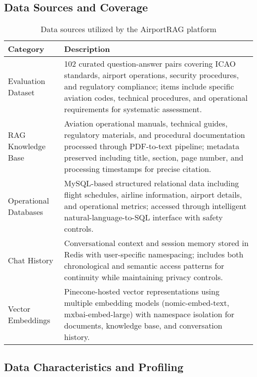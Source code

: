 \subsection{Data Sources and Coverage}
\label{subsec:data_sources_s2}
\begin{table}[H]
\centering
\caption{Data sources utilized by the AirportRAG platform}
\label{tab:data_sources_s2}
\begin{tabular}{|p{4cm}|p{12cm}|}
\hline
\textbf{Category} & \textbf{Description} \\
\hline
Evaluation Dataset &
102 curated question-answer pairs covering ICAO standards, airport operations, security procedures, and regulatory compliance; items include specific aviation codes, technical procedures, and operational requirements for systematic assessment. \\
\hline
RAG Knowledge Base &
Aviation operational manuals, technical guides, regulatory materials, and procedural documentation processed through PDF-to-text pipeline; metadata preserved including title, section, page number, and processing timestamps for precise citation. \\
\hline
Operational Databases &
MySQL-based structured relational data including flight schedules, airline information, airport details, and operational metrics; accessed through intelligent natural-language-to-SQL interface with safety controls. \\
\hline
Chat History &
Conversational context and session memory stored in Redis with user-specific namespacing; includes both chronological and semantic access patterns for continuity while maintaining privacy controls. \\
\hline
Vector Embeddings &
Pinecone-hosted vector representations using multiple embedding models (nomic-embed-text, mxbai-embed-large) with namespace isolation for documents, knowledge base, and conversation history. \\
\hline
\end{tabular}
\end{table}

\subsection{Data Characteristics and Profiling}
\label{subsec:characteristics_s2}

